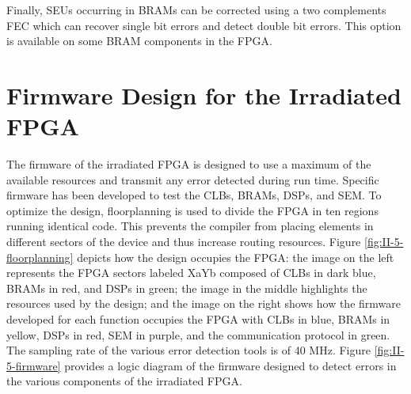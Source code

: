     Finally, SEUs occurring in BRAMs can be corrected using a two complements FEC which can recover single bit errors and detect double bit errors. This option is available on some BRAM components in the FPGA.

  \section{Firmware Design for the Irradiated FPGA}

    The firmware of the irradiated FPGA is designed to use a maximum of the available resources and transmit any error detected during run time. Specific firmware has been developed to test the CLBs, BRAMs, DSPs, and SEM. To optimize the design, floorplanning is used to divide the FPGA in ten regions running identical code. This prevents the compiler from placing elements in different sectors of the device and thus increase routing resources. Figure \ref{fig:II-5-floorplanning} depicts how the design occupies the FPGA: the image on the left represents the FPGA sectors labeled XaYb composed of CLBs in dark blue, BRAMs in red, and DSPs in green; the image in the middle highlights the resources used by the design; and the image on the right shows how the firmware developed for each function occupies the FPGA with CLBs in blue, BRAMs in yellow, DSPs in red, SEM in purple, and the communication protocol in green. The sampling rate of the various error detection tools is of 40 MHz. Figure \ref{fig:II-5-firmware} provides a logic diagram of the firmware designed to detect errors in the various components of the irradiated FPGA.

